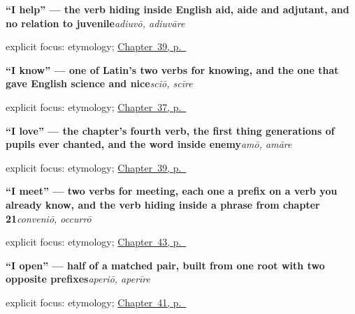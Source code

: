 \noindent\begin{minipage}[t]{\linewidth}
\raggedright
\textbf{\textquotedblleft{}I help\textquotedblright{} — the verb hiding inside English aid, aide and adjutant, and no relation to juvenile}\enspace\emph{adiuvō, adiuvāre}\par
\footnotesize explicit focus: etymology; \hyperref[ch:la-doing-verbs]{Chapter~39, p.~\pageref*{ch:la-doing-verbs}}
\end{minipage}\par\smallskip

\noindent\begin{minipage}[t]{\linewidth}
\raggedright
\textbf{\textquotedblleft{}I know\textquotedblright{} — one of Latin's two verbs for knowing, and the one that gave English science and nice}\enspace\emph{sciō, scīre}\par
\footnotesize explicit focus: etymology; \hyperref[ch:la-core-verbs]{Chapter~37, p.~\pageref*{ch:la-core-verbs}}
\end{minipage}\par\smallskip

\noindent\begin{minipage}[t]{\linewidth}
\raggedright
\textbf{\textquotedblleft{}I love\textquotedblright{} — the chapter's fourth verb, the first thing generations of pupils ever chanted, and the word inside enemy}\enspace\emph{amō, amāre}\par
\footnotesize explicit focus: etymology; \hyperref[ch:la-doing-verbs]{Chapter~39, p.~\pageref*{ch:la-doing-verbs}}
\end{minipage}\par\smallskip

\noindent\begin{minipage}[t]{\linewidth}
\raggedright
\textbf{\textquotedblleft{}I meet\textquotedblright{} — two verbs for meeting, each one a prefix on a verb you already know, and the verb hiding inside a phrase from chapter 21}\enspace\emph{conveniō, occurrō}\par
\footnotesize explicit focus: etymology; \hyperref[ch:la-answering-meeting-buying]{Chapter~43, p.~\pageref*{ch:la-answering-meeting-buying}}
\end{minipage}\par\smallskip

\noindent\begin{minipage}[t]{\linewidth}
\raggedright
\textbf{\textquotedblleft{}I open\textquotedblright{} — half of a matched pair, built from one root with two opposite prefixes}\enspace\emph{aperiō, aperīre}\par
\footnotesize explicit focus: etymology; \hyperref[ch:la-motion-verbs]{Chapter~41, p.~\pageref*{ch:la-motion-verbs}}
\end{minipage}\par\smallskip

